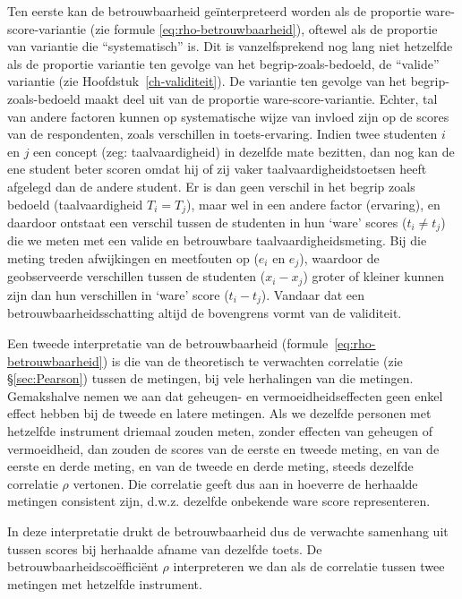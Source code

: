\documentclass[
]{book}
\begin{document}
Ten eerste kan de betrouwbaarheid geïnterpreteerd worden als de
proportie ware-score-variantie (zie formule \eqref{eq:rho-betrouwbaarheid}),
oftewel als de proportie van
variantie die ``systematisch'' is. Dit is vanzelfsprekend nog lang niet
hetzelfde als de proportie variantie ten gevolge van het
begrip-zoals-bedoeld, de ``valide'' variantie (zie
Hoofdstuk~\ref{ch-validiteit}). De variantie ten gevolge van het
begrip-zoals-bedoeld maakt deel uit van de proportie
ware-score-variantie. Echter, tal van andere factoren kunnen op
systematische wijze van invloed zijn op de scores van de respondenten,
zoals verschillen in toets-ervaring. Indien twee studenten \(i\) en \(j\)
een concept (zeg: taalvaardigheid) in dezelfde mate bezitten, dan nog
kan de ene student beter scoren omdat hij of zij vaker
taalvaardigheidstoetsen heeft afgelegd dan de andere student. Er is dan
geen verschil in het begrip zoals bedoeld (taalvaardigheid \(T_i = T_j\)),
maar wel in een andere factor (ervaring), en daardoor ontstaat een
verschil tussen de studenten in hun `ware' scores (\(t_i \neq t_j\)) die
we meten met een valide en betrouwbare taalvaardigheidsmeting. Bij die
meting treden afwijkingen en meetfouten op (\(e_i\) en \(e_j\)), waardoor de
geobserveerde verschillen tussen de studenten (\(x_i-x_j\)) groter of
kleiner kunnen zijn dan hun verschillen in `ware' score (\(t_i-t_j\)).
Vandaar dat een betrouwbaarheidsschatting altijd de bovengrens vormt van
de validiteit.

Een tweede interpretatie van de betrouwbaarheid (formule~\eqref{eq:rho-betrouwbaarheid})
is die van de theoretisch te verwachten correlatie (zie
§\ref{sec:Pearson}) tussen de metingen, bij vele herhalingen van
die metingen. Gemakshalve nemen we aan dat geheugen- en
vermoeidheidseffecten geen enkel effect hebben bij de tweede en latere
metingen. Als we dezelfde personen met hetzelfde instrument driemaal
zouden meten, zonder effecten van geheugen of vermoeidheid, dan zouden
de scores van de eerste en tweede meting, en van de eerste en derde
meting, en van de tweede en derde meting, steeds dezelfde correlatie
\(\rho\) vertonen. Die correlatie geeft dus aan in hoeverre de herhaalde
metingen consistent zijn, d.w.z. dezelfde onbekende ware score
representeren.

In deze interpretatie drukt de betrouwbaarheid dus de verwachte
samenhang uit tussen scores bij herhaalde afname van dezelfde toets. De
betrouwbaarheidscoëfficiënt \(\rho\) interpreteren we dan als de
correlatie tussen twee metingen met hetzelfde instrument.
\end{document}
